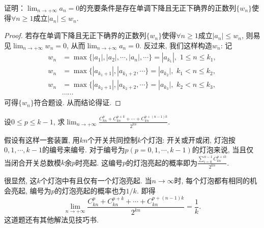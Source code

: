 \begin{quizb}
\woe 证明：\(\lim_{n\rightarrow +\infty}a_n=0\)的充要条件是存在单调下降且无正下确界的正数列\(\{w_n\}\)使得\(\forall n\geqslant 1\)成立\(\left|a_n\right|\leqslant w_n\).
\begin{proof}
若存在单调下降且无正下确界的正数列\(\{w_n\}\)使得\(\forall n\geqslant 1\)成立\(\left|a_n\right|\leqslant w_n\), 则易见\(\lim_{n\rightarrow+\infty}w_n=0\), 从而\(\lim_{n\rightarrow +\infty}a_n=0\). 反过来, 我们这样构造\(w_n\): 记\[\begin{split}
w_n&=\max\{|a_1|,|a_2|,\cdots,|a_n|,\cdots\}=|a_{k_1}|,\,\, 1\leqslant n\leqslant k_1,\\
w_n&=\max\{|a_{k_1+1}|,|a_{k_1+2},\cdots\}=|a_{k_2}|,\,\, k_1< n\leqslant k_2,\\
w_n&=\max\{|a_{k_2+1}|,|a_{k_2+2},\cdots\}=|a_{k_3}|,\,\, k_2< n\leqslant k_3,\\
&\cdots\cdots
\end{split}\]可得\(\{w_n\}\)符合题设. 从而结论得证.
\end{proof}
\woe 设\(0\leqslant p\leqslant k-1\), 求\( \lim_{n\rightarrow +\infty}\frac{C_{kn}^{p}+C_{kn}^{p+k}+\cdots+C_{kn}^{p+(n-1)k}}{2^{kn}}\).
\begin{solution}
假设有这样一套装置, 用\(kn\)个开关共同控制\(k\)个灯泡: 开关或开或闭, 灯泡按\(0,1,\cdots,k-1\)的编号来编号. 对于编号为\(p(p=0,1,\cdots,k-1)\)的灯泡来说, 当且仅当闭合开关总数模\(k\)余\(p\)时亮起. 这编号\(p\)的灯泡亮起的概率即为\(\frac{\displaystyle\sum_{i=0}^{n-1}C_{kn}^{p+ik}}{2^{kn}}\).

很显然, 这\(k\)个灯泡中有且仅有一个灯泡亮起. 当\(n\rightarrow\infty\)时, 每个灯泡都有相同的机会亮起, 编号为\(p\)的灯泡亮起的概率也为\(1/k\). 即得\[\lim_{n\rightarrow +\infty}\frac{C_{kn}^{p}+C_{kn}^{p+k}+\cdots+C_{kn}^{p+(n-1)k}}{2^{kn}}=\frac{1}{k}.\]这道题还有其他解法见技巧书.
\end{solution}
\end{quizb}
